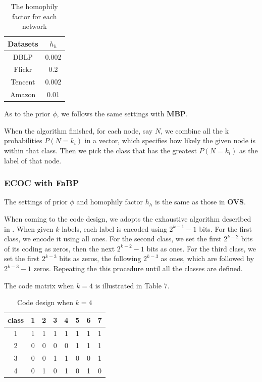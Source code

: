 \begin{table}[!ht]
\centering
\begin{tabular}{c|c}
\toprule
\textbf{Datasets} & \textbf{$h_h$}\\
\midrule
DBLP & 0.002\\
Flickr & 0.2\\
Tencent & 0.002\\
Amazon & 0.01\\
\bottomrule
\end{tabular}
\caption{The homophily factor for each network}
\end{table} 

As to the prior $\phi$, we follows the same settings with \textbf{MBP}.

When the algorithm finished, for each node, say $N$, we combine all the k probabilities $P(N=k_i)$ in a vector, which specifies how likely the given node is within that class. Then we pick the class that has the greatest $P(N=k_i)$ as the label of that node.

\subsubsection*{ECOC with \textbf{FaBP}}
The settings of prior $\phi$ and homophily factor $h_h$ is the same as those in \textbf{OVS}.

When coming to the code design, we adopts the exhaustive algorithm described in \cite{Thomas1995}. When given $k$ labels, each label is encoded using $2^{k-1}-1$ bits. For the first class, we encode it using all ones. For the second class, we set the first $2^{k-2}$ bits of its coding as zeros, then the next $2^{k-2}-1$ bits as ones. For the third class, we set the first $2^{k-3}$ bits as zeros, the following $2^{k-3}$ as ones, which are followed by $2^{k-3}-1$ zeros. Repeating the this procedure until all the classes are defined. 

The code matrix when $k=4$ is illustrated in Table 7.

\begin{table}[!ht]
\centering
\begin{tabular}{c|ccccccc}
\toprule
\textbf{class} & 1 & 2 & 3 & 4 & 5 & 6 & 7\\
\midrule
1 & 1 & 1 & 1 & 1 & 1 & 1 & 1\\
2 & 0 & 0 & 0 & 0 & 1 & 1 & 1\\
3 & 0 & 0 & 1 & 1 & 0 & 0 & 1\\
4 & 0 & 1 & 0 & 1 & 0 & 1 & 0\\
\bottomrule
\end{tabular}
\caption{Code design when $k=4$}
\end{table}

